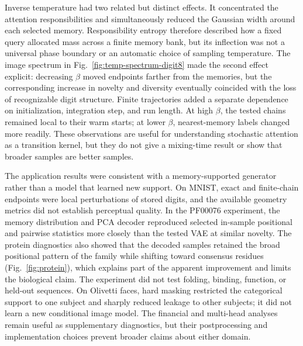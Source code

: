 Inverse temperature had two related but distinct effects. It concentrated the
attention responsibilities and simultaneously reduced the Gaussian width
around each selected memory. Responsibility entropy therefore described how a
fixed query allocated mass across a finite memory bank, but its inflection was
not a universal phase boundary or an automatic choice of sampling temperature.
The image spectrum in Fig.~\ref{fig:temp-spectrum-digit8} made the second
effect explicit: decreasing $\beta$ moved endpoints farther from the memories,
but the corresponding increase in novelty and diversity eventually coincided
with the loss of recognizable digit structure. Finite trajectories added a
separate dependence on initialization, integration step, and run length. At
high $\beta$, the tested chains remained local to their warm starts; at lower
$\beta$, nearest-memory labels changed more readily. These observations are
useful for understanding stochastic attention as a transition kernel, but they
do not give a mixing-time result or show that broader samples are better
samples.

The application results were consistent with a memory-supported generator
rather than a model that learned new support. On MNIST, exact and finite-chain
endpoints were local perturbations of stored digits, and the available geometry
metrics did not establish perceptual quality. In the PF00076 experiment, the
memory distribution and PCA decoder reproduced selected in-sample positional
and pairwise statistics more closely than the tested VAE at similar novelty.
The protein diagnostics also showed that the decoded samples retained the
broad positional pattern of the family while shifting toward consensus
residues (Fig.~\ref{fig:protein}), which explains part of the apparent
improvement and limits the biological claim. The experiment did not test
folding, binding, function, or held-out sequences. On Olivetti faces, hard
masking restricted the categorical support to one subject and sharply reduced
leakage to other subjects; it did not learn a new conditional image model. The
financial and multi-head analyses
remain useful as supplementary diagnostics, but their postprocessing and
implementation choices prevent broader claims about either domain.

